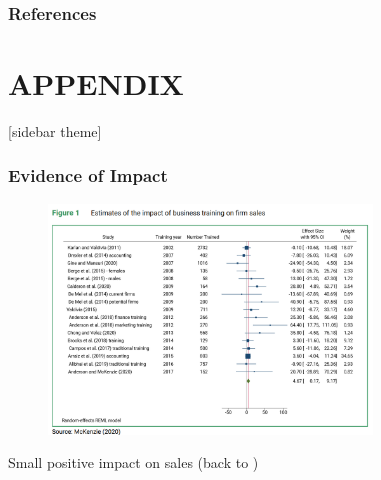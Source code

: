 \documentclass[hideothersubsections, usenames,dvipsnames,11pt]{beamer}
\newenvironment{itemize_2pt}{\itemize\addtolength{\itemsep}{2pt}}{\enditemize}
\begin{document}
\appendix
\begin{frame}[label=references, allowframebreaks]
\frametitle{References}


\end{frame}


\section*{\textbf{APPENDIX}}

[sidebar theme]



\begin{frame}[label=McK2020_sales]
\frametitle{Evidence of Impact}

	\begin{figure}[htbp]
		\centering
		\includegraphics[width=23.2em]{pics/McK2020_sales.png}
		\label{McKenzie(2020): Sales}
	\end{figure}	
	
	\vspace{-1em}	
	
	\begin{itemize_2pt}
		\item Small positive impact on sales (back to \hyperlink{McK2020_profits}{})
	\end{itemize_2pt}
	
\end{frame}
\end{document}
